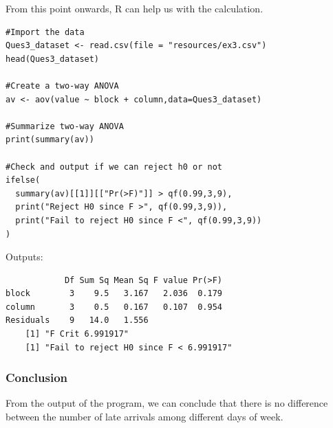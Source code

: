 \documentclass[a4paper]{article}
\numberwithin{equation}{section}
\begin{document}
From this point onwards, R can help us with the calculation.


\begin{mdframed}[leftline=false,rightline=false,backgroundcolor=magenta!10,nobreak=true]
  \begin{verbatim}
#Import the data
Ques3_dataset <- read.csv(file = "resources/ex3.csv")
head(Ques3_dataset)

#Create a two-way ANOVA
av <- aov(value ~ block + column,data=Ques3_dataset)

#Summarize two-way ANOVA
print(summary(av))

#Check and output if we can reject h0 or not
ifelse(
  summary(av)[[1]][["Pr(>F)"]] > qf(0.99,3,9),
  print("Reject H0 since F >", qf(0.99,3,9)),
  print("Fail to reject H0 since F <", qf(0.99,3,9))
)
  \end{verbatim}
\end{mdframed}

Outputs:
\begin{mdframed}[leftline=false,rightline=false,backgroundcolor=magenta!10,nobreak=true]
  \begin{verbatim}
            Df Sum Sq Mean Sq F value Pr(>F)
block        3    9.5   3.167   2.036  0.179
column       3    0.5   0.167   0.107  0.954
Residuals    9   14.0   1.556
    [1] "F Crit 6.991917"
    [1] "Fail to reject H0 since F < 6.991917"
  \end{verbatim}
\end{mdframed}
\subsubsection{Conclusion}
From the output of the program, we can conclude that there is no difference between the number of late arrivals among different days of week.
\newpage
\end{document}
